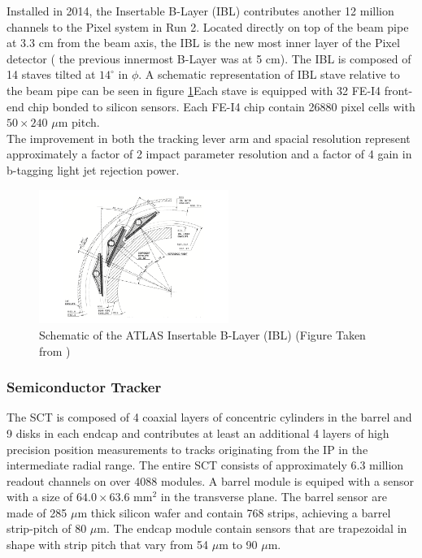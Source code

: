 \indent Installed in 2014, the Insertable B-Layer (IBL) contributes another 12 million channels to the Pixel system in Run 2.\cite{IBLOverview,IBL_TDR}  Located directly on top of the beam pipe at 3.3 cm from the beam axis, the IBL is the new most inner layer of the Pixel detector ( the previous innermost B-Layer was at 5 cm). The IBL is composed of 14 staves tilted at $14^{\circ}$ in $\phi$.  A schematic representation of IBL stave relative to the beam pipe can be seen in figure \ref{LHC:fig:IBL}Each stave is equipped with 32 FE-I4 front-end chip bonded to silicon sensors. Each FE-I4 chip contain 26880 pixel cells with $50 \times 240$ $\mu$m pitch.\\

\indent The improvement in both the tracking lever arm and spacial resolution represent approximately a factor of 2 impact parameter resolution and a factor of 4 gain in b-tagging light jet rejection power. \\

\begin{figure}[h!]
\centering
\includegraphics[width=0.55\textwidth, angle=0]{figures/LHC_ATLAS/fig_ibl_layout_rev.png}
\caption{ Schematic of the ATLAS Insertable B-Layer (IBL) (Figure Taken from \cite{IBLOverview}) \label{LHC:fig:IBL}}
\end{figure}

\subsubsection*{ Semiconductor Tracker}

\indent The SCT is composed of 4 coaxial layers of concentric cylinders in the barrel and 9 disks in each endcap and contributes at least an additional 4 layers of high precision position measurements to tracks originating from the IP in the intermediate radial range.  The entire SCT consists of approximately 6.3 million readout channels on over 4088 modules.  A barrel module is equiped with a sensor with a size of $64.0 \times 63.6$ mm$^2$ in the transverse plane.  The barrel sensor are made of 285 $\mu$m thick silicon wafer and contain 768 strips, achieving a barrel strip-pitch of 80 $\mu$m.  The endcap module contain sensors that are trapezoidal in shape with strip pitch that vary from 54 $\mu$m to 90 $\mu$m.  \\

